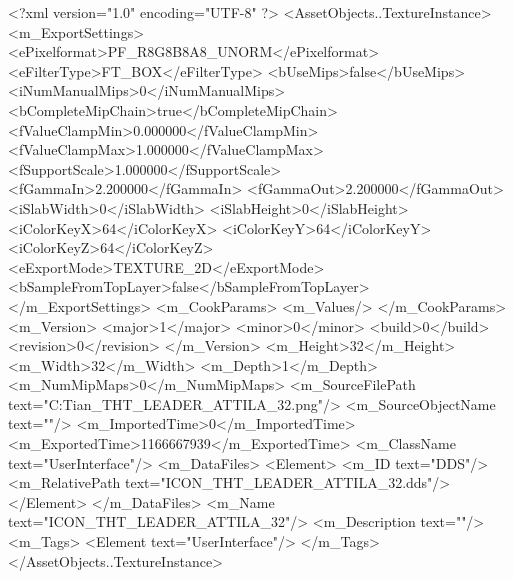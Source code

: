 <?xml version="1.0" encoding="UTF-8" ?>
<AssetObjects..TextureInstance>
	<m_ExportSettings>
		<ePixelformat>PF_R8G8B8A8_UNORM</ePixelformat>
		<eFilterType>FT_BOX</eFilterType>
		<bUseMips>false</bUseMips>
		<iNumManualMips>0</iNumManualMips>
		<bCompleteMipChain>true</bCompleteMipChain>
		<fValueClampMin>0.000000</fValueClampMin>
		<fValueClampMax>1.000000</fValueClampMax>
		<fSupportScale>1.000000</fSupportScale>
		<fGammaIn>2.200000</fGammaIn>
		<fGammaOut>2.200000</fGammaOut>
		<iSlabWidth>0</iSlabWidth>
		<iSlabHeight>0</iSlabHeight>
		<iColorKeyX>64</iColorKeyX>
		<iColorKeyY>64</iColorKeyY>
		<iColorKeyZ>64</iColorKeyZ>
		<eExportMode>TEXTURE_2D</eExportMode>
		<bSampleFromTopLayer>false</bSampleFromTopLayer>
	</m_ExportSettings>
	<m_CookParams>
		<m_Values/>
	</m_CookParams>
	<m_Version>
		<major>1</major>
		<minor>0</minor>
		<build>0</build>
		<revision>0</revision>
	</m_Version>
	<m_Height>32</m_Height>
	<m_Width>32</m_Width>
	<m_Depth>1</m_Depth>
	<m_NumMipMaps>0</m_NumMipMaps>
	<m_SourceFilePath text="C:\Users\Troy Tian\Downloads\ICON_THT_LEADER_ATTILA_32.png"/>
	<m_SourceObjectName text=""/>
	<m_ImportedTime>0</m_ImportedTime>
	<m_ExportedTime>1166667939</m_ExportedTime>
	<m_ClassName text="UserInterface"/>
	<m_DataFiles>
		<Element>
			<m_ID text="DDS"/>
			<m_RelativePath text="ICON_THT_LEADER_ATTILA_32.dds"/>
		</Element>
	</m_DataFiles>
	<m_Name text="ICON_THT_LEADER_ATTILA_32"/>
	<m_Description text=""/>
	<m_Tags>
		<Element text="UserInterface"/>
	</m_Tags>
</AssetObjects..TextureInstance>

